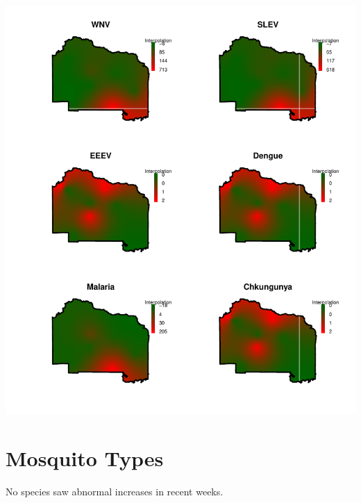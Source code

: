 \documentclass{article}
\begin{document}
\includegraphics{mosquitoReport-008}


\section*{Mosquito Types}
\hrulefill
\vspace{5mm}

No species saw abnormal increases in recent weeks.  
\end{document}

